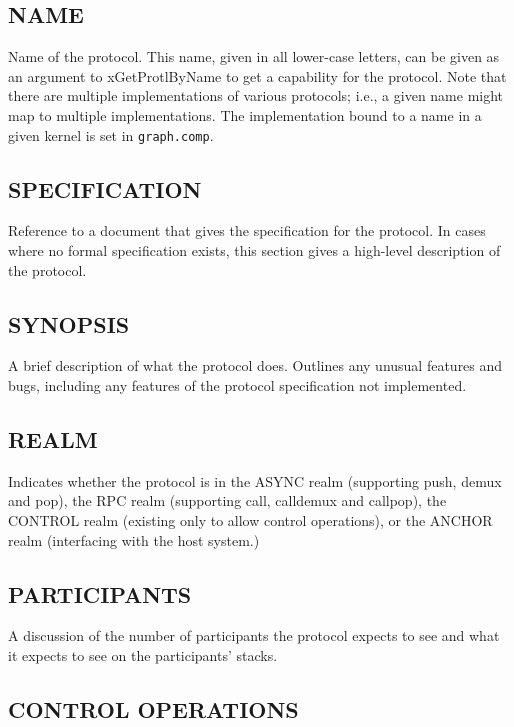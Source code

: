 \subsection*{NAME}

\noindent Name of the protocol. This name, given in all lower-case letters,
can be given as an argument to {\sanss xGetProtlByName} to get a capability
for the protocol. Note that there are multiple implementations of various
protocols; i.e., a given name might map to multiple implementations. The
implementation bound to a name in a given kernel is set in {\tt graph.comp}.

\subsection*{SPECIFICATION}

\noindent Reference to a document that gives the specification for the
protocol. In cases where no formal specification exists, this section
gives a high-level description of the protocol.

\subsection*{SYNOPSIS}

\noindent A brief description of what the protocol does. Outlines
any unusual features and bugs, including any features of the
protocol specification not implemented.

\subsection*{REALM}

\noindent
Indicates whether the protocol is in the ASYNC realm (supporting
push, demux and pop), the RPC realm (supporting call,
calldemux and callpop), the CONTROL realm (existing only to allow
control operations), or the ANCHOR realm (interfacing with the host
system.) 

\subsection*{PARTICIPANTS}

\noindent 
A discussion of the number of participants the
protocol expects to see and what it expects to see on the
participants' stacks.

\subsection*{CONTROL OPERATIONS}


